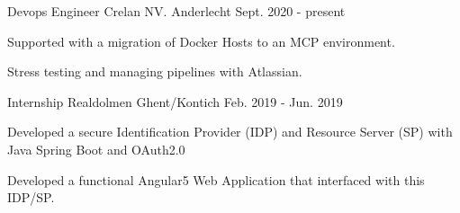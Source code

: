 

\begin{cventries}

  \cvlistentry
    {Devops Engineer} %
    {Crelan NV.} %
    {Anderlecht} %
    {Sept. 2020 - present} %
    {
      \begin{cvitems} %
	    \item {Supported with a migration of Docker Hosts to an MCP environment.}
	    \item {Stress testing and managing pipelines with Atlassian.}
      \end{cvitems}
  	}

  \cvlistentry
    {Internship} %
    {Realdolmen} %
    {Ghent/Kontich} %
    {Feb. 2019 - Jun. 2019} %
    {
      \begin{cvitems} %
	    \item {Developed a secure Identification Provider (IDP) and Resource Server (SP) with Java Spring Boot and OAuth2.0}
        \item {Developed a functional Angular5 Web Application that interfaced with this IDP/SP.}
      \end{cvitems}
    }

\end{cventries}
